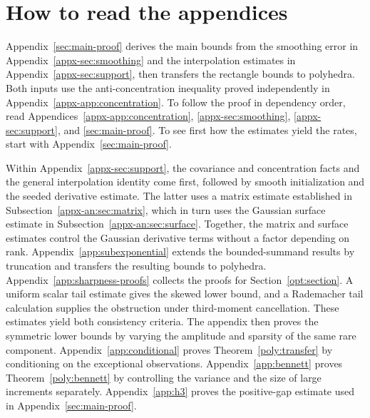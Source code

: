 \documentclass[11pt,letterpaper]{article}
\theoremstyle{remark}
\begin{document}
\clearpage
\appendix
{}

\section*{How to read the appendices}
Appendix~\ref{sec:main-proof} derives the main bounds from the smoothing
error in Appendix~\ref{appx-sec:smoothing} and the interpolation estimates
in Appendix~\ref{appx-sec:support}, then transfers the rectangle bounds
to polyhedra. Both inputs use the anti-concentration inequality proved
independently in Appendix~\ref{appx-app:concentration}. To follow the proof
in dependency order, read Appendices~\ref{appx-app:concentration},
\ref{appx-sec:smoothing}, \ref{appx-sec:support}, and
\ref{sec:main-proof}. To see first how the estimates yield the rates,
start with Appendix~\ref{sec:main-proof}.

Within Appendix~\ref{appx-sec:support}, the covariance and concentration
facts and the general interpolation identity come first, followed by
smooth initialization and the seeded derivative estimate. The latter
uses a matrix estimate established in
Subsection~\ref{appx-an:sec:matrix}, which in turn uses the
Gaussian surface estimate in Subsection~\ref{appx-an:sec:surface}.
Together, the matrix and surface estimates control the Gaussian
derivative terms without a factor depending on rank.
Appendix~\ref{app:subexponential} extends the bounded-summand results by truncation and transfers
the resulting bounds to polyhedra. Appendix~\ref{app:sharpness-proofs}
collects the proofs for Section~\ref{opt:section}. A uniform scalar
tail estimate gives the skewed lower bound, and a Rademacher tail
calculation supplies the obstruction under third-moment cancellation.
These estimates yield both consistency criteria. The appendix then
proves the symmetric lower bounds by varying the amplitude and
sparsity of the same rare component. Appendix~\ref{app:conditional}
proves Theorem~\ref{poly:transfer} by conditioning on the exceptional
observations. Appendix~\ref{app:bennett} proves
Theorem~\ref{poly:bennett} by controlling the variance and the size of
large increments separately. Appendix~\ref{app:h3} proves the
positive-gap estimate used in Appendix~\ref{sec:main-proof}.
\end{document}
